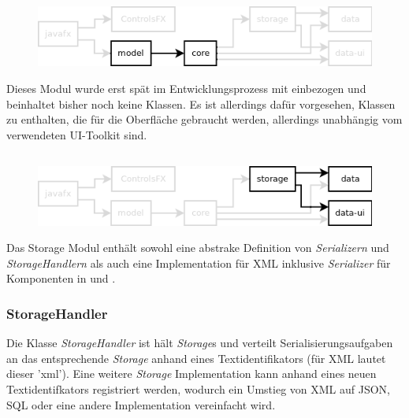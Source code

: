 \subsection{\textModModel}
\label{\textModModel}
\begin{figure}[H]
	\centering
	\includegraphics[width=.8\textwidth]{module_dependencies_model.png}
\end{figure}

Dieses Modul wurde erst spät im Entwicklungsprozess mit einbezogen und beinhaltet bisher noch keine Klassen.
Es ist allerdings dafür vorgesehen, Klassen zu enthalten, die für die Oberfläche gebraucht werden, allerdings
unabhängig vom verwendeten UI-Toolkit sind.

\subsection{\textModStorage}
\label{\textModStorage}
\begin{figure}[H]
	\centering
	\includegraphics[width=.8\textwidth]{module_dependencies_storage.png}
\end{figure}

Das Storage Modul enthält sowohl eine abstrake Definition von \textit{Serializern} und \textit{StorageHandlern}
als auch eine Implementation für XML inklusive \textit{Serializer} für Komponenten in  und
.

\subsubsection{StorageHandler}
Die Klasse \textit{StorageHandler} ist hält \textit{Storage}s und verteilt Serialisierungsaufgaben an
das entsprechende \textit{Storage} anhand eines Textidentifikators (für XML lautet dieser 'xml').
Eine weitere \textit{Storage} Implementation kann anhand eines neuen Textidentifkators registriert werden,
wodurch ein Umstieg von XML auf JSON, SQL oder eine andere Implementation vereinfacht wird.

